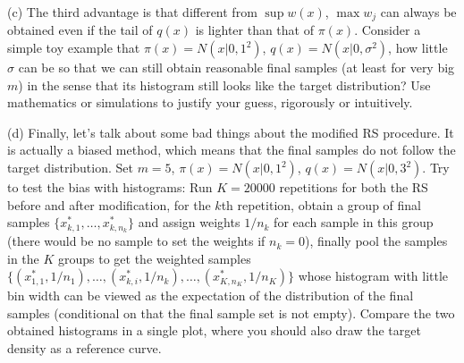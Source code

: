 \documentclass[12pt]{article}
\begin{document}
(c) The third advantage is that different from $\sup w(x)$, $\max w_j$ can always be obtained even if the tail of $q(x)$ is lighter than that of $\pi(x)$. Consider a simple toy example that $\pi(x)=N(x|0,1^2)$, $q(x)=N(x|0,\sigma^2)$, how little $\sigma$ can be so that we can still obtain reasonable final samples (at least for very big $m$) in the sense that its histogram still looks like the target distribution? Use mathematics or simulations to justify your guess, rigorously or intuitively. 

(d) Finally, let's talk about some bad things about the modified RS procedure. It is actually a biased method, which means that the final samples do not follow the target distribution. Set $m=5$, $\pi(x)=N(x|0,1^2)$, $q(x)=N(x|0,3^2)$. Try to test the bias with histograms: Run $K=20000$ repetitions for both the RS before and after modification, for the $k$th repetition, obtain a group of final samples $\{x_{k,1}^*,\dots,x_{k,n_k}^*\}$ and assign weights $1/n_k$ for each sample in this group (there would be no sample to set the weights if $n_k=0$), finally pool the samples in the $K$ groups to get the weighted samples $\{(x_{1,1}^*,1/n_1),\dots,(x_{k,i}^*,1/n_k),\dots,(x_{K,n_K}^*,1/n_K)\}$ whose histogram with little bin width can be viewed as the expectation of the distribution of the final samples (conditional on that the final sample set is not empty). Compare the two obtained histograms in a single plot, where you should also draw the target density as a reference curve. 
\end{document}
